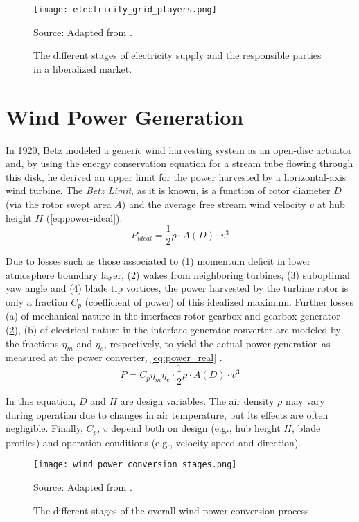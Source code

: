 \begin{figure}[H]%
	\centering
    \caption{The different stages of electricity supply and the responsible parties in a liberalized market.}
    \texttt{[image: electricity\_grid\_players.png]} \\
    \raggedright
    Source: Adapted from \cite{erbach2016market}.
	\label{fig:electricity_grid_players}
\end{figure}

\section{Wind Power Generation}

In 1920, Betz \cite{betz1920limit} modeled a generic wind harvesting system as an open-disc actuator and, by using the energy conservation equation for a stream tube flowing through this disk, he derived an upper limit for the power harvested by a horizontal-axis wind turbine. The \textit{Betz Limit}, as it is known, is a function of rotor diameter $D$ (via the rotor swept area $A$) and the average free stream wind velocity $v$ at hub height $H$ (\ref{eq:power-ideal}).
\begin{equation}\label{eq:power-ideal}
P_{ideal} = \frac{1}{2}\rho \cdot A(D)\cdot v^3
\end{equation}

Due to losses such as those associated to (1) momentum deficit in lower atmosphere boundary layer, (2) wakes from neighboring turbines, (3) suboptimal yaw angle and (4) blade tip vortices, the power harvested by the turbine rotor is only a fraction $C_p$ (coefficient of power) of this idealized maximum. Further  losses (a) of mechanical nature in the interfaces rotor-gearbox and gearbox-generator (\ref{fig:wind_power_conversion_stages}), (b) of electrical nature in the interface generator-converter  are modeled by the fractions $\eta_{m}$ and $\eta_{e}$, respectively,  to yield the actual power generation as measured at the power converter, \ref{eq:power_real} \cite{albadi2009capacity}.
\begin{equation}\label{eq:power_real}
P = C_p\eta_{m} \eta_{e}  \cdot \frac{1}{2}\rho \cdot A(D)\cdot v^3
\end{equation}

In this equation, $D$ and $H$ are design variables. The air density $\rho$ may vary during operation due to changes in air temperature, but its effects are often negligible. Finally, $C_p$, $v$ depend both on design (e.g., hub height $H$, blade profiles) and operation conditions (e.g., velocity speed and direction).
\begin{figure}[H] %
	\centering
    \caption{ The different stages of the overall wind power conversion process. }
    \texttt{[image: wind\_power\_conversion\_stages.png]} \\
    \raggedright
    Source: Adapted from \cite{molina2011modelling}.
	\label{fig:wind_power_conversion_stages}
\end{figure}


